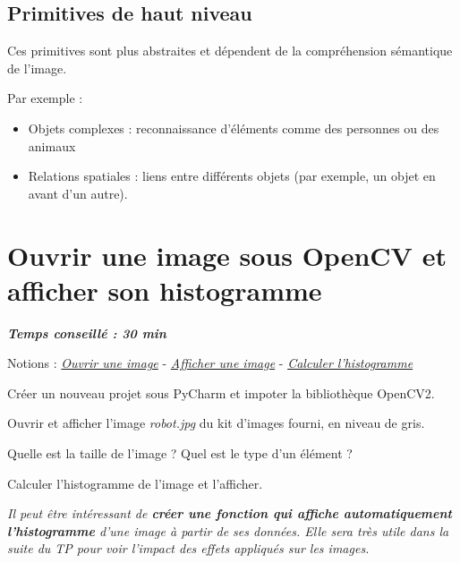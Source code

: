 \documentclass[a4paper,11pt,titlepage]{article} %
\begin{document}
\subsection{Primitives de haut niveau}

Ces primitives sont plus abstraites et dépendent de la compréhension sémantique de l'image. 

Par exemple :

\begin{itemize}
	\item Objets complexes : reconnaissance d'éléments comme des personnes ou des animaux
	\item Relations spatiales : liens entre différents objets (par exemple, un objet en avant d'un autre).
\end{itemize}



\newpage
\section{Ouvrir une image sous OpenCV et afficher son histogramme}

\begin{center} \textbf{\textit{Temps conseillé : 30 min}} \end{center}

\begin{mdframed}[style=sidebar,frametitle={}]
Notions : \href{https://iogs-lense-training.github.io/image-processing/contents/opencv.html#open-an-image}{\textit{Ouvrir une image}} - \href{https://iogs-lense-training.github.io/image-processing/contents/opencv.html#display-an-image
}{\textit{Afficher une image}} - \href{https://iogs-lense-training.github.io/image-processing/contents/opencv.html#enhance-the-image-contrast-and-brightness}{\textit{Calculer l'histogramme}}
\end{mdframed}
 
\Manip Créer un nouveau projet sous PyCharm et impoter la bibliothèque OpenCV2.

\Manip Ouvrir et afficher l'image \textsl{robot.jpg} du kit d'images fourni, en niveau de gris.

\Quest Quelle est la taille de l'image ? Quel est le type d'un élément ?

\Manip Calculer l'histogramme de l'image et l'afficher.

\medskip

\textit{Il peut être intéressant de \textbf{créer une fonction qui affiche automatiquement l'histogramme} d'une image à partir de ses données. Elle sera très utile dans la suite du TP pour voir l'impact des effets appliqués sur les images.}
\end{document}
